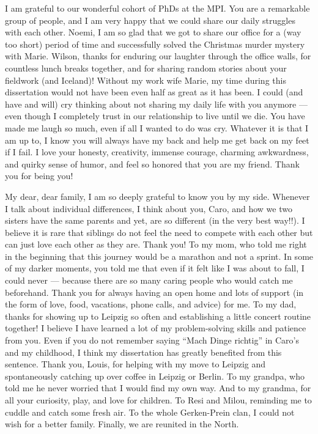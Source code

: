 \documentclass[
]{scrbook}
\begin{document}
I am grateful to our wonderful cohort of PhDs at the MPI. You are a remarkable group of people, and I am very happy that we could share our daily struggles with each other. Noemi, I am so glad that we got to share our office for a (way too short) period of time and successfully solved the Christmas murder mystery with Marie. Wilson, thanks for enduring our laughter through the office walls, for countless lunch breaks together, and for sharing random stories about your fieldwork (and Iceland)! Without my work wife Marie, my time during this dissertation would not have been even half as great as it has been. I could (and have and will) cry thinking about not sharing my daily life with you anymore --- even though I completely trust in our relationship to live until we die. You have made me laugh so much, even if all I wanted to do was cry. Whatever it is that I am up to, I know you will always have my back and help me get back on my feet if I fail. I love your honesty, creativity, immense courage, charming awkwardness, and quirky sense of humor, and feel so honored that you are my friend. Thank you for being you!

My dear, dear family, I am so deeply grateful to know you by my side. Whenever I talk about individual differences, I think about you, Caro, and how we two sisters have the same parents and yet, are so different (in the very best way!!). I believe it is rare that siblings do not feel the need to compete with each other but can just love each other as they are. Thank you! To my mom, who told me right in the beginning that this journey would be a marathon and not a sprint. In some of my darker moments, you told me that even if it felt like I was about to fall, I could never --- because there are so many caring people who would catch me beforehand. Thank you for always having an open home and lots of support (in the form of love, food, vacations, phone calls, and advice) for me. To my dad, thanks for showing up to Leipzig so often and establishing a little concert routine together! I believe I have learned a lot of my problem-solving skills and patience from you. Even if you do not remember saying ``Mach Dinge richtig'' in Caro's and my childhood, I think my dissertation has greatly benefited from this sentence. Thank you, Louis, for helping with my move to Leipzig and spontaneously catching up over coffee in Leipzig or Berlin. To my grandpa, who told me he never worried that I would find my own way. And to my grandma, for all your curiosity, play, and love for children. To Resi and Milou, reminding me to cuddle and catch some fresh air. To the whole Gerken-Prein clan, I could not wish for a better family. Finally, we are reunited in the North.
\end{document}
